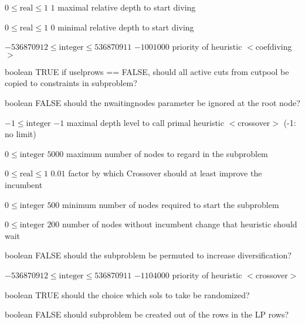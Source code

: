 %
{$0\leq\textrm{real}\leq1$}%
{$1$}%
{maximal relative depth to start diving}%
{}

%
{$0\leq\textrm{real}\leq1$}%
{$0$}%
{minimal relative depth to start diving}%
{}

%
{$-536870912\leq\textrm{integer}\leq536870911$}%
{$-1001000$}%
{priority of heuristic $<$coefdiving$>$}%
{}

%
{boolean}%
{TRUE}%
{if uselprows == FALSE, should all active cuts from cutpool be copied to constraints in subproblem?}%
{}

%
{boolean}%
{FALSE}%
{should the nwaitingnodes parameter be ignored at the root node?}%
{}

%
{$-1\leq\textrm{integer}$}%
{$-1$}%
{maximal depth level to call primal heuristic $<$crossover$>$ (-1: no limit)}%
{}

%
{$0\leq\textrm{integer}$}%
{$5000$}%
{maximum number of nodes to regard in the subproblem}%
{}

%
{$0\leq\textrm{real}\leq1$}%
{$0.01$}%
{factor by which Crossover should at least improve the incumbent}%
{}

%
{$0\leq\textrm{integer}$}%
{$500$}%
{minimum number of nodes required to start the subproblem}%
{}

%
{$0\leq\textrm{integer}$}%
{$200$}%
{number of nodes without incumbent change that heuristic should wait}%
{}

%
{boolean}%
{FALSE}%
{should the subproblem be permuted to increase diversification?}%
{}

%
{$-536870912\leq\textrm{integer}\leq536870911$}%
{$-1104000$}%
{priority of heuristic $<$crossover$>$}%
{}

%
{boolean}%
{TRUE}%
{should the choice which sols to take be randomized?}%
{}

%
{boolean}%
{FALSE}%
{should subproblem be created out of the rows in the LP rows?}%
{}

